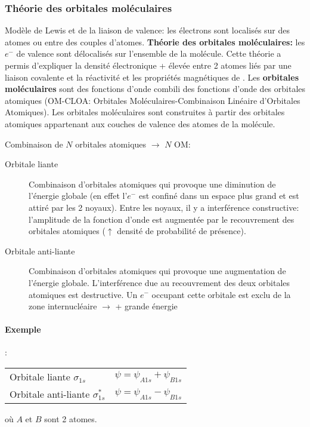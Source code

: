 \subsubsection{Théorie des orbitales moléculaires}
Modèle de Lewis et de la liaison de valence: les électrons sont localisés sur des atomes ou entre des couples d'atomes.
\textbf{Théorie des orbitales moléculaires:} les $e^-$ de valence sont délocalisés sur l'ensemble de la molécule.
Cette théorie a permis d'expliquer la densité électronique + élevée entre 2 atomes liés par une liaison covalente et la réactivité et les propriétés magnétiques de .
Les \textbf{orbitales moléculaires} sont des fonctions d'onde combili des fonctions d'onde des orbitales atomiques (OM-CLOA: Orbitales Moléculaires-Combinaison Linéaire d'Orbitales Atomiques).
Les orbitales moléculaires sont construites à partir des orbitales atomiques appartenant aux couches de valence des atomes de la molécule.

Combinaison de $N$ orbitales atomiques $\rightarrow$ $N$ OM:
\begin{description}
  \item[Orbitale liante] Combinaison d'orbitales atomiques qui provoque une diminution de l'énergie globale (en effet l'$e^-$ est confiné dans un espace plus grand et est attiré par les 2 noyaux).
    Entre les noyaux,
    il y a interférence constructive: l'amplitude de la fonction d'onde est augmentée par le recouvrement des orbitales atomiques ($\uparrow$ densité de probabilité de présence).

  \item[Orbitale anti-liante] Combinaison d'orbitales atomiques qui provoque une augmentation de l'énergie globale.
    L'interférence due au recouvrement des deux orbitales atomiques est destructive.
    Un $e^-$ occupant cette orbitale est exclu de la zone internucléaire $\rightarrow$ + grande énergie
\end{description}

\paragraph{Exemple}
:
\begin{center}
  \begin{tabular}{ll}
    Orbitale liante $\sigma_{1s}$ & $\psi=\psi_{A1s}+\psi_{B1s}$\\
    Orbitale anti-liante $\sigma^{*}_{1s}$ & $\psi=\psi_{A1s}-\psi_{B1s}$
  \end{tabular}
\end{center}
où $A$ et $B$ sont 2 atomes.

